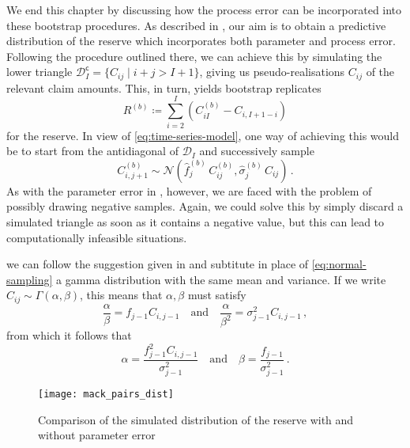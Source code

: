 \documentclass[a4paper]{book}
\begin{document}
We end this chapter by discussing how the process error can be incorporated into these bootstrap procedures. As described in , our aim is to obtain a predictive distribution of the reserve which incorporates both parameter and process error. Following the procedure outlined there, we can achieve this by simulating the lower triangle $\mathcal{D}^{\mathsf{c}}_I = \{ C_{ij} \mid i + j > I + 1 \}$, giving us pseudo-realisations $C_{ij}$ of the relevant claim amounts. This, in turn, yields bootstrap replicates
\begin{equation}
    R^{(b)} \coloneqq \sum_{i = 2}^I (C^{(b)}_{iI} - C_{i, I + 1 - i})
\end{equation}
for the reserve. In view of \eqref{eq:time-series-model}, one way of achieving this would be to start from the antidiagonal of $\mathcal{D}_I$ and successively sample
\begin{equation} \label{eq:normal-sampling}
    C^{(b)}_{i, j + 1} \sim \mathcal{N}(\widehat{f}^{(b)}_j \, C^{(b)}_{ij}, \widehat{\sigma}^{(b)}_j \, C_{ij}) \,.
\end{equation}
As with the parameter error in , however, we are faced with the problem of possibly drawing negative samples. Again, we could solve this by simply discard a simulated triangle as soon as it contains a negative value, but this can lead to computationally infeasible situations. 

we can follow the suggestion given in \cite[238]{england:dist} and subtitute in place of \eqref{eq:normal-sampling} a gamma distribution with the same mean and variance. If we write $C_{ij} \sim \Gamma(\alpha, \beta)$, this means that $\alpha, \beta$ must satisfy
\begin{equation}
\frac{\alpha}{\beta} = f_{j-1} C_{i, j-1} \quad \text{and} \quad \frac{\alpha}{\beta^2} = \sigma^2_{j-1} C_{i, j-1} \,,
\end{equation}
from which it follows that
\begin{equation}
\alpha = \frac{f_{j-1}^2 C_{i, j-1}}{\sigma_{j-1}^2} \quad \text{and} \quad \beta = \frac{f_{j-1}}{\sigma_{j-1}^2} \,.
\end{equation}


\begin{figure}
  \texttt{[image: mack\_pairs\_dist]}
  \caption{Comparison of the simulated distribution of the reserve with and without parameter error}
\end{figure}
\end{document}
